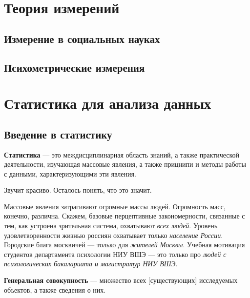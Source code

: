 \documentclass[
  letterpaper,
]{scrbook}
\theoremstyle{definition}
\theoremstyle{remark}
\begin{document}
\part{Теория измерений}


\chapter{Измерение в социальных
науках}\label{ux438ux437ux43cux435ux440ux435ux43dux438ux435-ux432-ux441ux43eux446ux438ux430ux43bux44cux43dux44bux445-ux43dux430ux443ux43aux430ux445}


\chapter{Психометрические
измерения}\label{ux43fux441ux438ux445ux43eux43cux435ux442ux440ux438ux447ux435ux441ux43aux438ux435-ux438ux437ux43cux435ux440ux435ux43dux438ux44f}

\part{Статистика для анализа данных}


\chapter{Введение в статистику}\label{stats-intro}

\textbf{Статистика} --- это междисциплинарная область знаний, а также
практической деятельности, изучающая массовые явления, а также прицнипи
и методы работы с данными, характеризующими эти явления.

Звучит красиво. Осталось понять, что это значит.

Массовые явления затрагивают огромные массы людей. Огромность масс,
конечно, различна. Скажем, базовые перцептивные закономерности,
связанные с тем, как устроена зрительная система, охватывают \emph{всех
людей}. Уровень удовлетворенности жизнью россиян охватывает только
\emph{население России}. Городские блага москвичей --- только для
\emph{жителей Москвы}. Учебная мотивация студентов департамента
психологии НИУ ВШЭ --- это только про \emph{людей с психологических
бакалариата и магистратур НИУ ВШЭ}.

\textbf{Генеральная совокупность} --- множество всех {[}существующих{]}
исследуемых объектов, а также сведения о них.
\end{document}

